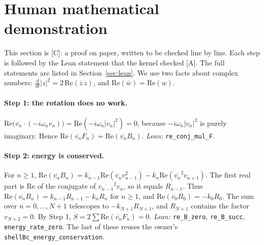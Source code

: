 \documentclass[11pt]{article}
\newcommand{\leanst}[1]{}
\theoremstyle{remark}
\newcommand{\tier}[1]{\textsf{[#1]}}
\newcommand{\lean}[1]{\texttt{#1}}
\newcommand{\cj}[1]{\overline{#1}}
\begin{document}
\section{Human mathematical demonstration}\label{sec:human}

This section is \tier{C}: a proof on paper, written to be checked line by line. Each step is followed by the Lean statement
that the kernel checked \tier{A}. The full statements are listed in Section~\ref{sec:lean}. We use two facts about complex
numbers: $\frac{d}{dt}|z|^2=2\,\mathrm{Re}(\cj z\,\dot z)$, and $\mathrm{Re}(\cj w)=\mathrm{Re}(w)$.

\paragraph{Step 1: the rotation does no work.} $\mathrm{Re}\big(\cj{v_n}\cdot(-i\omega_nv_n)\big)=\mathrm{Re}(-i\omega_n|v_n|^2)=0$,
because $-i\omega_n|v_n|^2$ is purely imaginary. Hence $\mathrm{Re}(\cj{v_n}F_n)=\mathrm{Re}(\cj{v_n}B_n)$.
\emph{Lean:} \lean{re\_conj\_mul\_F}.
\leanst{re_conj_mul_F}

\paragraph{Step 2: energy is conserved.} For $n\ge1$,
$\mathrm{Re}(\cj{v_n}B_n)=k_{n-1}\mathrm{Re}(\cj{v_n}v_{n-1}^2)-k_n\mathrm{Re}(\cj{v_n}^2v_{n+1})$. The first real part is
$\mathrm{Re}$ of the conjugate of $\cj{v_{n-1}}^2v_n$, so it equals $R_{n-1}$. Thus
$\mathrm{Re}(\cj{v_n}B_n)=k_{n-1}R_{n-1}-k_nR_n$ for $n\ge1$, and $\mathrm{Re}(\cj{v_0}B_0)=-k_0R_0$.
The sum over $n=0,\dots,N+1$ telescopes to $-k_{N+1}R_{N+1}$, and $R_{N+1}$ contains the factor $v_{N+2}=0$. By Step 1,
$\dot S=2\sum\mathrm{Re}(\cj{v_n}F_n)=0$. \emph{Lean:} \lean{re\_B\_zero}, \lean{re\_B\_succ},
\lean{energy\_rate\_zero}. The last of these reuses the owner's \lean{shellBc\_energy\_conservation}.
\leanst{re_B_succ}\leanst{energy_rate_zero}
\end{document}
